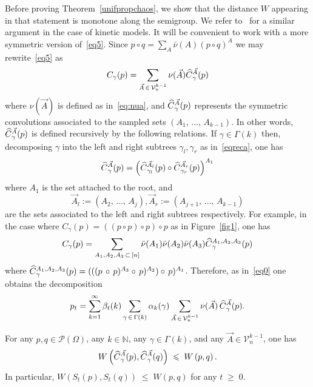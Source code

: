 \documentclass[AHL,Unicode,longabstracts,published]{cedram}
\renewcommand{\leq}{\;\leqslant\;}
\renewcommand{\geq}{\;\geqslant\;}
\newcommand{\cP}{\mathcal{P}}
\newcommand{\cV}{\mathcal{V}}
\newcommand{\bbN}{\mathbb{N}}
\let\b=\beta
\let\g=\gamma
\let\G=\Gamma
\let\O=\Omega
\let\oldhat\hat
\renewcommand*{\hat}[1]{\mathchoice{\widehat{#1}}{\widehat{#1}}{\oldhat{#1}}{\oldhat{#1}}}
\begin{document}
Before proving Theorem~\ref{unifpropchaos}, we show that the distance $W$ appearing in that statement is monotone along the semigroup. We refer to~\cite{tanaka} for a similar argument in the case of kinetic models. It will be convenient to work with a more symmetric version of~\eqref{eq5}. Since $p\circ q = \sum_A \bar\nu(A) (p\circ q)^A$ we may rewrite~\eqref{eq5} as
\begin{align}\label{eq:symme}
C_{\gamma}(p)= \sum_{\vec A\,\in\,\cV_n^{k-1}} \nu(\vec A)
\hat{C}^{\vec A}_{\gamma}(p)
\end{align}
where $\nu(\vec A)$ is defined as in~\eqref{eq:nua}, and $\hat{C}^{\vec A}_{\gamma}(p)$ represents the symmetric convolutions associated to the sampled sets $(A_1,\,\dots,\,A_{k-1})$. In other words, $\hat{C}^{\vec A}_{\gamma}(p)$ is defined recursively by the following relations. If $\gamma \in \Gamma(k)$ then, decomposing $\g$ into the left and right subtrees $\g_l,\g_r$ as in~\eqref{eqreca}, one has
\begin{align}\label{lab:rec}
 \hat{C}^{\vec A}_{\gamma}(p) = \left(\hat{C}^{\vec{A}_{l}}_{\gamma_l}(p)\circ \hat{C}^{\vec{A}_{r}}_{\gamma_r}(p)\right)^{A_1}
\end{align}
where $A_1$ is the set attached to the root, and
\[
\vec{A}_{l} :=\left(A_2,\,\dots,\,A_j\right), \vec{A}_{r} :=\left(A_{j+1},\,\dots,\,A_{k-1}\right)
\]
are the sets associated to the left and right subtrees respectively. For example, in the case where $C_{\gamma}(p) = ((p \circ p)\circ p)\circ p$ as in Figure~\ref{fig1}, one has
\begin{align}
C_{\gamma}(p) = \sum_{A_1,A_2,A_3\,\subset\, [n]}\bar\nu(A_1)\bar \nu(A_2)\bar \nu(A_3)\hat{C}^{A_1,A_2,A_3}_{\gamma}(p)
\end{align}
where $\hat{C}^{A_1,A_2,A_3}_{\gamma}(p) = (((p\, \circ\, p)^{A_3}\circ \,p)^{A_2})\circ\, p)^{A_1}$. Therefore, as in~\eqref{eq0} one obtains the decomposition
\begin{align}\label{eq60}
p_t=\sum_{k=1}^{\infty}\b_t(k)\sum_{\g\,\in \,\Gamma(k)}\alpha_k(\g)\sum_{\vec A\,\in \,\cV_n^{k-1}}\nu(\vec A) \,\hat C^{\vec A}_{\gamma}(p).
\end{align}

\begin{lemm}\label{wasscontrlemma}
For any $p, q \in \cP(\O)$, any $k\in\bbN$, any $\g\in\G(k)$, and any $\vec A\in \cV_n^{k-1}$, one has
\begin{align}\label{eq:mon1}
W\left(\hat C^{\vec A}_{\gamma}(p),\hat C^{\vec A}_{\gamma}(q)\right) \leq W\left(p,q\right).
\end{align}
In particular, $W(S_t(p),S_t(q)) \leq W(p,q)$ for any $t\geq 0$.
\end{lemm}
\end{document}
